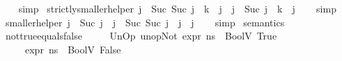 \begin{isabellebody}
%
\isadelimproof
\ \ %
\endisadelimproof
%
\isatagproof
{}\isamarkupfalse%
\ simp%
\endisatagproof
{\isafoldproof}%
%
\isadelimproof
\isanewline
%
\endisadelimproof
\isanewline
{}\isamarkupfalse%
\ strictly{\isacharunderscore}{\kern0pt}smaller{\isacharunderscore}{\kern0pt}helper{}{\isacharcolon}{\kern0pt}\ {\isachardoublequoteopen}j{\isacharprime}{\kern0pt}\ {\isacharequal}{\kern0pt}\ Suc\ {\isacharparenleft}{\kern0pt}Suc\ j{\isacharprime}{\kern0pt}{\isacharprime}{\kern0pt}{\isacharparenright}{\kern0pt}\ {\isasymLongrightarrow}\ k\ {\isacharless}{\kern0pt}\ j{\isacharprime}{\kern0pt}{\isacharprime}{\kern0pt}\ {\isasymLongrightarrow}\ j\ {\isacharequal}{\kern0pt}\ Suc\ j{\isacharprime}{\kern0pt}\ {\isasymLongrightarrow}\ k\ {\isacharless}{\kern0pt}\ j{\isachardoublequoteclose}\isanewline
%
\isadelimproof
\ \ %
\endisadelimproof
%
\isatagproof
{}\isamarkupfalse%
\ simp%
\endisatagproof
{\isafoldproof}%
%
\isadelimproof
\isanewline
%
\endisadelimproof
\isanewline
{}\isamarkupfalse%
\ smaller{\isacharunderscore}{\kern0pt}helper{}{\isacharcolon}{\kern0pt}\ {\isachardoublequoteopen}j\ {\isacharequal}{\kern0pt}\ Suc\ j{}\ {\isasymLongrightarrow}\ j{}\ {\isacharequal}{\kern0pt}\ Suc\ {\isacharparenleft}{\kern0pt}Suc\ j{}{\isacharparenright}{\kern0pt}\ {\isasymLongrightarrow}\ j{}\ {\isacharless}{\kern0pt}\ j{\isachardoublequoteclose}\isanewline
%
\isadelimproof
\ \ %
\endisadelimproof
%
\isatagproof
{}\isamarkupfalse%
\ simp%
\endisatagproof
{\isafoldproof}%
%
\isadelimproof
\isanewline
%
\endisadelimproof
\isanewline
\isanewline
{}\isamarkupfalse%
\ semantics\ \isanewline
\isanewline
{}\isamarkupfalse%
\ not{\isacharunderscore}{\kern0pt}true{\isacharunderscore}{\kern0pt}equals{\isacharunderscore}{\kern0pt}false{\isacharcolon}{\kern0pt}\isanewline
\ \ \ {\isachardoublequoteopen}{\isasymLambda}{\isacharcomma}{\kern0pt}{\isasymGamma}{\isacharcomma}{\kern0pt}{\isasymOmega}\ {\isasymturnstile}\ {\isasymlangle}UnOp\ unop{\isachardot}{\kern0pt}Not\ expr{\isacharcomma}{\kern0pt}\ ns{}{\isasymrangle}\ {\isasymDown}\ BoolV\ True{\isachardoublequoteclose}\isanewline
\ \ \ {\isachardoublequoteopen}{\isasymLambda}{\isacharcomma}{\kern0pt}{\isasymGamma}{\isacharcomma}{\kern0pt}{\isasymOmega}\ {\isasymturnstile}\ {\isasymlangle}expr{\isacharcomma}{\kern0pt}\ ns{}{\isasymrangle}\ {\isasymDown}\ BoolV\ {\isacharparenleft}{\kern0pt}False{\isacharparenright}{\kern0pt}{\isachardoublequoteclose}\ \ \isanewline

\end{isabellebody}
